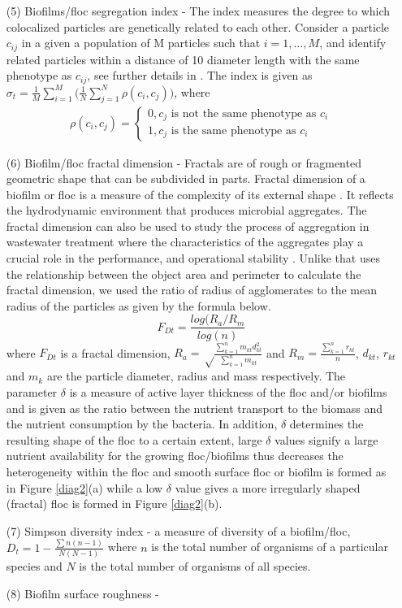 \begin{itemize}
\item[(5)] Biofilms/floc segregation index - The index measures the degree to which colocalized particles are genetically related to each other. Consider a particle $c_{ij}$ in a given a population of M particles such that $i=1,\ldots,M$, and identify related particles within a distance of 10 diameter length with the same phenotype as  $c_{ij}$, see further details in \citet{co9}.
The index is given as $\sigma_t=\frac{1}{M}\sum \limits_{i=1}^M \Big(\frac{1}{N}\sum \limits_{j=1}^N\rho(c_i,c_j)\Big)$, where
\begin{align}
\rho(c_i,c_j)=\begin{cases}
 0, \text{$c_j$ is not the same phenotype as $c_i$}\\
1, \text{$c_j$ is the same phenotype as $c_i$} 
\end{cases}
\end{align}
\item[(6)] Biofilm/floc fractal dimension - Fractals are of rough or fragmented geometric shape that can be subdivided in parts. 
Fractal dimension of a biofilm or floc is a measure of the complexity of its external shape \citep{co7}. It reflects the hydrodynamic environment that produces microbial aggregates. The fractal dimension can also be used to study the process of aggregation in wastewater treatment where the characteristics of the aggregates play a crucial role in the performance, and operational stability \citet{co6}. Unlike \citet{co7} that uses the relationship between the object area and perimeter to calculate the fractal dimension, we used the ratio of radius of agglomerates to the mean radius of the particles as given by the formula below. 
\begin{equation}
F_{Dt}=\frac{log(R_a/R_m}{log(n)}
\end{equation} 
where $F_{Dt}$ is a fractal dimension, $R_a=\sqrt \frac{\sum \limits_{k=1}^n m_{kt} d_{kt}^2}{\sum \limits_{k=1}^n m_{kt}}$ and 
$R_m=\frac{\sum \limits_{k=1}^n r_{kt}}{n}$, $d_{kt}$, $r_{kt}$ and $m_k$ are the particle diameter, radius and mass respectively. 
The parameter $\delta$ is a measure of active layer thickness of the floc and/or biofilms and is given as the ratio between the nutrient transport to the biomass and the nutrient consumption by the bacteria. In addition, $\delta$ determines the resulting shape of the floc to a certain extent, large $\delta$ values signify a large nutrient availability for the growing floc/biofilms thus decreases the heterogeneity within the floc and smooth surface floc or biofilm is formed as in Figure \ref{diag2}(a) while a low $\delta$ value gives a more irregularly shaped (fractal) floc is formed in Figure \ref{diag2}(b).

\item[(7)] Simpson diversity index - a measure of diversity of a biofilm/floc, $D_t=1-\frac{\sum n(n-1)}{N(N-1)}$ where $n$ is the total number of organisms of a particular species and $N$ is the total number of organisms of all species. 

\item[(8)] Biofilm surface roughness - 

\end{itemize}

